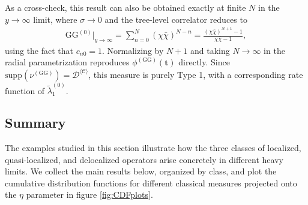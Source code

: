 \documentclass[a4paper,11pt]{article}
\theoremstyle{plain}
\theoremstyle{definition}
\theoremstyle{remark}
\newcommand{\bs}[1]{\boldsymbol{#1}}
\newcommand{\ba}{\begin{equation} \begin{aligned}}
\newcommand{\ea}{\end{aligned} \end{equation}}
\begin{document}
As a cross-check, this result can also be obtained exactly at finite $N$ in the $y \to \infty$ limit, where $\sigma \to 0$ and the tree-level correlator reduces to
\ba
\mathrm{GG}^{(0)}\big|_{y \to \infty} = \sum_{n = 0}^N (\chi \bar{\chi})^{N-n} = \frac{(\chi \bar{\chi})^{N+1} - 1 }{\chi \bar{\chi} -1},
\ea
using the fact that $c_{n0} = 1$. Normalizing by $N+1$ and taking $N \to \infty$ in the radial parametrization reproduces $\phi^{(\mathrm{GG})}(\bs{t})$ directly. Since $\mathrm{supp}(\nu^{(\mathrm{GG})}) = \mathcal{D}^{\langle \mathcal{C} \rangle}$, this measure is purely Type 1, with a corresponding rate function of $\tilde{\lambda}_1^{(0)}$.


\subsection{Summary}

The examples studied in this section illustrate how the three classes of localized, quasi-localized, and delocalized operators arise concretely in different heavy limits. We collect the main results below, organized by class, and plot the cumulative distribution functions for different classical measures projected onto the $\eta$ parameter in figure \ref{fig:CDFplots}.
\end{document}
